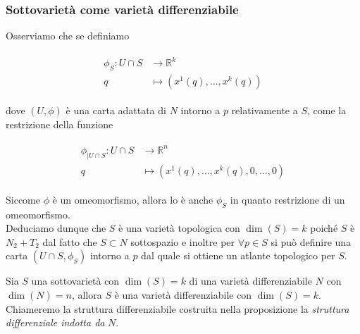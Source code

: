 \subsubsection{Sottovarietà come varietà differenziabile}

Osserviamo che se definiamo

\begin{align}
	\begin{split}
		\phi_{S} : U \cap S &\to \mathbb{R}^{k}\\
		q &\mapsto (x^{1}(q),\dots,x^{k}(q))
	\end{split}
\end{align}

dove $ (U,\phi) $ è una carta adattata di $ N $ intorno a $ p $ relativamente a $ S $, come la restrizione della funzione

\begin{align}
	\begin{split}
		\phi_{| U \cap S} : U \cap S &\to \mathbb{R}^{n}\\
		q &\mapsto (x^{1}(q),\dots,x^{k}(q),0,\dots,0)
	\end{split}
\end{align}

Siccome $ \phi $ è un omeomorfismo, allora lo è anche $ \phi_{S} $ in quanto restrizione di un omeomorfismo.\\
Deduciamo dunque che $ S $ è una varietà topologica con $ \dim(S)=k $ poiché $ S $ è $ N_{2}+T_{2} $ dal fatto che $ S \subset N $ sottospazio e inoltre per $ \forall p \in S $ si può definire una carta $ (U \cap S,\phi_{S}) $ intorno a $ p $ dal quale si ottiene un atlante topologico per $ S $.

\begin{definition}
	Sia $ S $ una sottovarietà con $ \dim(S)=k $ di una varietà differenziabile $ N $ con $ \dim(N)=n $, allora $ S $ è una varietà differenziabile con $ \dim(S)=k $.\\
	Chiameremo la struttura differenziabile costruita nella proposizione la \textit{struttura differenziale indotta da} $ N $.
\end{definition}

